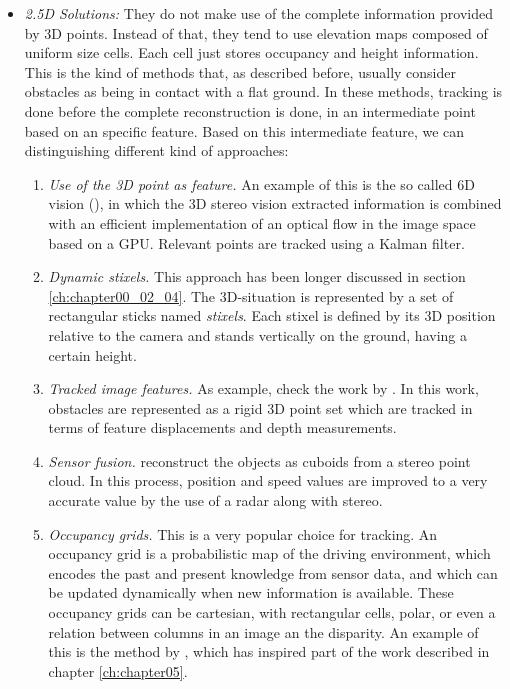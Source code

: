 \begin{itemize}
 \item \emph{2.5D Solutions:} They do not make use of the complete information provided by 3D points. Instead of that, they tend to use elevation maps composed of uniform size cells. Each cell just stores occupancy and height information. This is the kind of methods that, as described before, usually consider obstacles as being in contact with a flat ground.
 In these methods, tracking is done before the complete reconstruction is done, in an intermediate point based on an specific feature. Based on this intermediate feature, we can distinguishing different kind of approaches:
  \begin{enumerate}
   \item \emph{Use of the 3D point as feature.} An example of this is the so called 6D vision (\cite{franke20056d}), in which the 3D stereo vision extracted information is combined with an efficient implementation of an optical flow in the image space based on a \ac{GPU}. Relevant points are tracked using a Kalman filter.
   \item \emph{Dynamic stixels.} This approach has been longer discussed in section \ref{ch:chapter00_02_04}. The 3D-situation is represented by a set of rectangular sticks named \emph{stixels}. Each stixel is defined by its 3D position relative to the camera and stands vertically on the ground, having a certain height.
   \item \emph{Tracked image features.} As example, check the work by \cite{barth2009estimating}. In this work, obstacles are represented as a rigid 3D point set which are tracked in terms of feature displacements and depth measurements.
   \item \emph{Sensor fusion.} \cite{wu2009collision} reconstruct the objects as cuboids from a stereo point cloud. In this process, position and speed values are improved to a very accurate value by the use of a radar along with stereo.
   \item \emph{Occupancy grids.} This is a very popular choice for tracking. An occupancy grid is a probabilistic map of the driving environment, which encodes the past and present knowledge from sensor data, and which can be updated dynamically when new information is available. These occupancy grids can be cartesian, with rectangular cells, polar, or even a relation between columns in an image an the disparity. An example of this is the method by \cite{danescu2012particle}, which has inspired part of the work described in chapter \ref{ch:chapter05}.

\end{enumerate}
\end{itemize}
